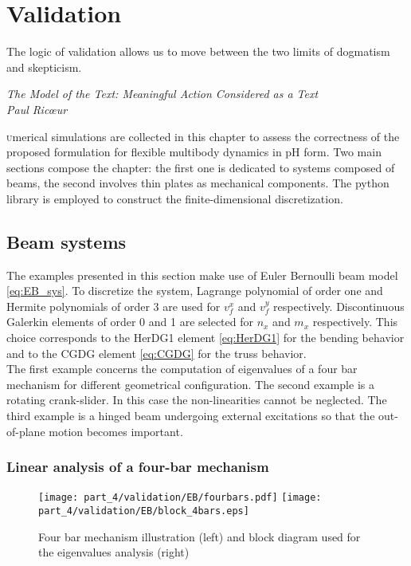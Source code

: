\chapter{Validation}\label{ch:valid}

\epigraph{The logic of validation allows us to move between the two limits of dogmatism and skepticism.}{\textit{The Model of the Text: Meaningful Action Considered as a Text\\
Paul Ric\oe{}ur}}

\minitoc

\lettrine{\color{theme}{N}}umerical simulations are collected in this chapter to assess the correctness of the proposed formulation for flexible multibody dynamics in pH form. Two main sections compose the chapter: the first one is dedicated to systems composed of beams, the second involves  thin plates as mechanical components. The {} python library \cite{rathgeber2017firedrake} is employed to construct the finite-dimensional discretization.

\section{Beam systems}
The examples presented in this section make use of Euler Bernoulli beam model \eqref{eq:EB_sys}. To discretize the system, Lagrange polynomial of order one and Hermite polynomials of order 3 are used for $v_f^x$ and $v_f^y$ respectively. Discontinuous Galerkin elements of order 0 and 1 are selected for $n_x$ and $m_{x}$ respectively. This choice corresponds to the HerDG1 element \eqref{eq:HerDG1} for the bending behavior and to the CGDG element \eqref{eq:CGDG} for the truss behavior.  \\
 
The first example concerns the computation of eigenvalues of a four bar mechanism for different geometrical configuration. The second example is a rotating crank-slider. In this case the non-linearities cannot be neglected. The third example is a hinged beam undergoing external excitations so that the out-of-plane motion becomes important.   


\subsection{Linear analysis of a four-bar mechanism}

\begin{figure}[tb]
	\centering
	\texttt{[image: part\_4/validation/EB/fourbars.pdf]} 
	\hspace{.3cm}
	\texttt{[image: part\_4/validation/EB/block\_4bars.eps]} 
	\caption{Four bar mechanism illustration (left) and block diagram used for the eigenvalues analysis (right)}
	\label{fig:4bars}
\end{figure}

